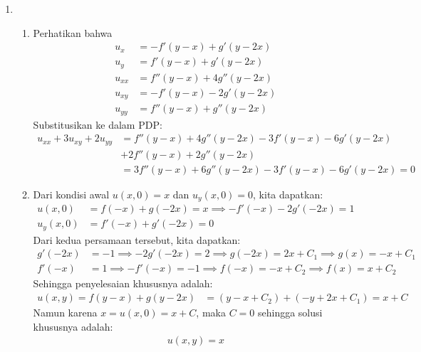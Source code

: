 \documentclass{article}
\theoremstyle{definition}
\begin{document}
\begin{enumerate}
  \item \begin{enumerate}
  \item Perhatikan bahwa
  \begin{align*}
    u_x &= -f'(y - x) + g'(y - 2x) \\
    u_y &= f'(y - x) + g'(y - 2x) \\
    u_{xx} &= f''(y - x) + 4g''(y - 2x) \\
    u_{xy} &= -f'(y - x) - 2g'(y - 2x) \\
    u_{yy} &= f''(y - x) + g''(y - 2x)
  \end{align*}
  Substitusikan ke dalam PDP:
  \begin{align*}
    u_{xx} + 3u_{xy} + 2u_{yy} &= f''(y - x) + 4g''(y - 2x) - 3f'(y - x) - 6g'(y - 2x) \\
    &+ 2f''(y - x) + 2g''(y - 2x) \\
    &= 3f''(y - x) + 6g''(y - 2x) - 3f'(y - x) - 6g'(y - 2x) = 0
  \end{align*}
  \item Dari kondisi awal \( u(x,0) = x \) dan \( u_y(x,0) = 0 \), kita dapatkan:
  \begin{align*}
    u(x,0) &= f(-x) + g(-2x) = x \implies -f'(-x) -2 g'(-2x) = 1 \\
    u_y(x,0) &= f'(-x) + g'(-2x) = 0
  \end{align*}
  Dari kedua persamaan tersebut, kita dapatkan:
  \begin{align*}
    g'(-2x) &= -1 \implies -2g'(-2x) = 2 \implies g(-2x) = 2x + C_1 \implies g(x) = -x + C_1 \\
    f'(-x) &= 1 \implies -f'(-x) = -1 \implies f(-x) = -x + C_2 \implies f(x) = x + C_2
  \end{align*}
  Sehingga penyelesaian khususnya adalah:
  \begin{align*}
        u(x,y) = f(y - x) + g(y - 2x) &= (y - x + C_2) + (-y + 2x + C_1) = x + C
  \end{align*}
  Namun karena $x=u(x,0)=x+C$, maka $C=0$ sehingga solusi khususnya adalah:
  \begin{align*}
    \boxed{u(x,y) = x}
  \end{align*}
\end{enumerate}


\end{enumerate}
\end{document}
